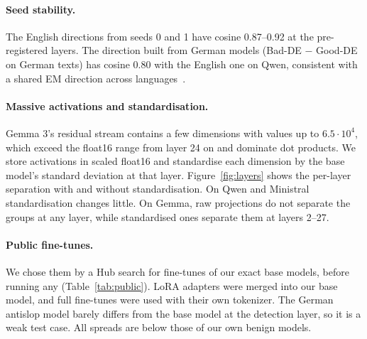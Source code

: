 \documentclass[11pt]{article}
\begin{document}
\paragraph{Seed stability.} The English directions from seeds 0 and 1 have cosine 0.87--0.92 at the pre-registered layers. The direction built from German models (Bad-DE $-$ Good-DE on German texts) has cosine 0.80 with the English one on Qwen, consistent with a shared EM direction across languages~\citep{adesina2026}.

\paragraph{Massive activations and standardisation.} Gemma 3's residual stream contains a few dimensions with values up to $6.5\cdot10^4$, which exceed the float16 range from layer 24 on and dominate dot products. We store activations in scaled float16 and standardise each dimension by the base model's standard deviation at that layer. Figure~\ref{fig:layers} shows the per-layer separation with and without standardisation. On Qwen and Ministral standardisation changes little. On Gemma, raw projections do not separate the groups at any layer, while standardised ones separate them at layers 2--27.

\paragraph{Public fine-tunes.} We chose them by a Hub search for fine-tunes of our exact base models, before running any (Table~\ref{tab:public}). LoRA adapters were merged into our base model, and full fine-tunes were used with their own tokenizer. The German antislop model barely differs from the base model at the detection layer, so it is a weak test case. All spreads are below those of our own benign models.
\end{document}
